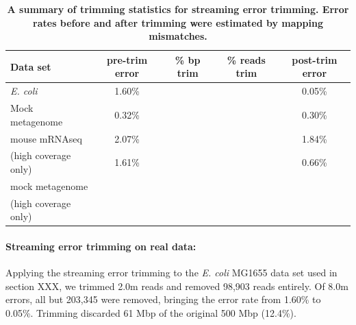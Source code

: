 \documentclass{article}
\begin{document}
\begin{table}
\begin{tabular}{|l|c|c|c|c|}
\hline
Data set        & pre-trim error & \% bp trim & \% reads trim & post-trim error \\
\hline
{\em E. coli}   & 1.60\%         &                  &             & 0.05\% \\
Mock metagenome & 0.32\%         &                  &             & 0.30\% \\
mouse mRNAseq   & 2.07\%         &                  &             & 1.84\% \\
(high coverage only) & 1.61\%    &                  &             & 0.66\% \\
mock metagenome &                &                  &             &        \\
(high coverage only) &           &                  &             &        \\
\hline
\end{tabular}

\caption{{\bf A summary of trimming statistics for streaming error trimming.
Error rates before and after trimming were estimated by mapping mismatches.}}
\label{tab:trimming}
\end{table}

\paragraph{Streaming error trimming on real data:}



%

Applying the streaming error trimming to the {\em E. coli} MG1655 data
set used in section XXX, we trimmed 2.0m reads and removed 98,903
reads entirely.  Of 8.0m errors, all but 203,345 were removed,
bringing the error rate from 1.60\% to 0.05\%.  Trimming discarded 61
Mbp of the original 500 Mbp (12.4\%).
\end{document}
